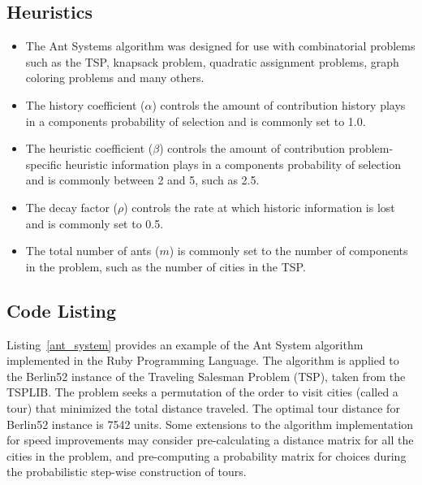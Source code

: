 \subsection{Heuristics}
\begin{itemize}
	\item The Ant Systems algorithm was designed for use with combinatorial problems such as the TSP, knapsack problem, quadratic assignment problems, graph coloring problems and many others.
	\item The history coefficient ($\alpha$) controls the amount of contribution history plays in a components probability of selection and is commonly set to 1.0.
	\item The heuristic coefficient ($\beta$) controls the amount of contribution problem-specific heuristic information plays in a components probability of selection and is commonly between 2 and 5, such as 2.5.
	\item The decay factor ($\rho$) controls the rate at which historic information is lost and is commonly set to 0.5.
	\item The total number of ants ($m$) is commonly set to the number of components in the problem, such as the number of cities in the TSP.
\end{itemize}

\subsection{Code Listing}
Listing~\ref{ant_system} provides an example of the Ant System algorithm implemented in the Ruby Programming Language. 
The algorithm is applied to the Berlin52 instance of the Traveling Salesman Problem (TSP), taken from the TSPLIB. The problem seeks a permutation of the order to visit cities (called a tour) that minimized the total distance traveled. The optimal tour distance for Berlin52 instance is 7542 units.
Some extensions to the algorithm implementation for speed improvements may consider pre-calculating a distance matrix for all the cities in the problem, and pre-computing a probability matrix for choices during the probabilistic step-wise construction of tours. 

